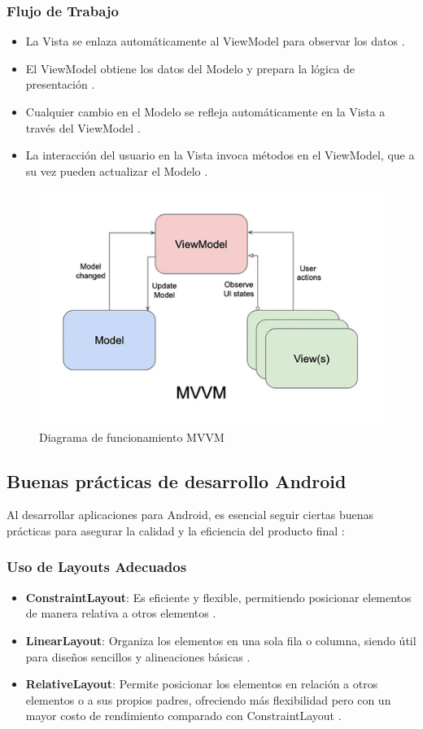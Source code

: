 \subsubsection{Flujo de Trabajo}
\begin{itemize}
    \item La Vista se enlaza automáticamente al ViewModel para observar los datos \cite{Bhadoria2013}.
    \item El ViewModel obtiene los datos del Modelo y prepara la lógica de presentación \cite{Bhadoria2013}.
    \item Cualquier cambio en el Modelo se refleja automáticamente en la Vista a través del ViewModel \cite{Bhadoria2013}.
    \item La interacción del usuario en la Vista invoca métodos en el ViewModel, que a su vez pueden actualizar el Modelo \cite{Bhadoria2013}.
\end{itemize}

\begin{figure}
    \centering
    \includegraphics[width=0.5\linewidth]{figuras/mvvm.png}
    \caption{Diagrama de funcionamiento MVVM}
    \label{fig:enter-label}
\end{figure}

\subsection{Buenas prácticas de desarrollo Android}
Al desarrollar aplicaciones para Android, es esencial seguir ciertas buenas prácticas para asegurar la calidad y la eficiencia del producto final \cite{PhillipsStewart2022}:

\subsubsection{Uso de Layouts Adecuados}
\begin{itemize}
    \item \textbf{ConstraintLayout}: Es eficiente y flexible, permitiendo posicionar elementos de manera relativa a otros elementos \cite{PhillipsStewart2022}.
    \item \textbf{LinearLayout}: Organiza los elementos en una sola fila o columna, siendo útil para diseños sencillos y alineaciones básicas \cite{PhillipsStewart2022}.
    \item \textbf{RelativeLayout}: Permite posicionar los elementos en relación a otros elementos o a sus propios padres, ofreciendo más flexibilidad pero con un mayor costo de rendimiento comparado con ConstraintLayout \cite{PhillipsStewart2022}.
\end{itemize}

